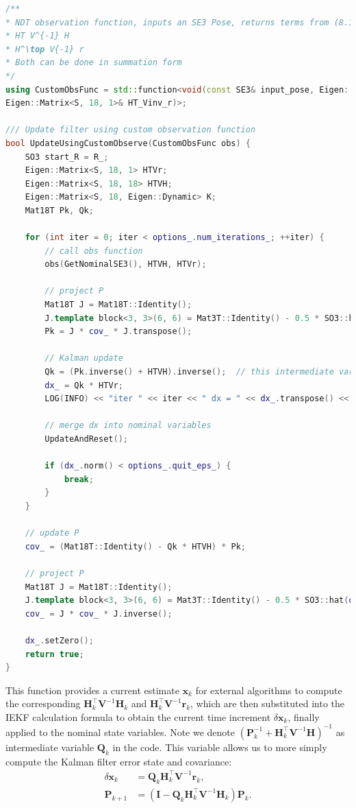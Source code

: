 \begin{lstlisting}[language=c++,caption=src/ch8/lio-iekf/iekf.hpp]
/**
* NDT observation function, inputs an SE3 Pose, returns terms from (8.10)
* HT V^{-1} H
* H^\top V{-1} r
* Both can be done in summation form
*/
using CustomObsFunc = std::function<void(const SE3& input_pose, Eigen::Matrix<S, 18, 18>& HT_Vinv_H,
Eigen::Matrix<S, 18, 1>& HT_Vinv_r)>;

/// Update filter using custom observation function
bool UpdateUsingCustomObserve(CustomObsFunc obs) {
	SO3 start_R = R_;
	Eigen::Matrix<S, 18, 1> HTVr;
	Eigen::Matrix<S, 18, 18> HTVH;
	Eigen::Matrix<S, 18, Eigen::Dynamic> K;
	Mat18T Pk, Qk;
	
	for (int iter = 0; iter < options_.num_iterations_; ++iter) {
		// call obs function
		obs(GetNominalSE3(), HTVH, HTVr);
		
		// project P
		Mat18T J = Mat18T::Identity();
		J.template block<3, 3>(6, 6) = Mat3T::Identity() - 0.5 * SO3::hat((R_.inverse() * start_R).log());
		Pk = J * cov_ * J.transpose();
		
		// Kalman update
		Qk = (Pk.inverse() + HTVH).inverse();  // this intermediate variable can be used in final update
		dx_ = Qk * HTVr;
		LOG(INFO) << "iter " << iter << " dx = " << dx_.transpose() << ", dxn: " << dx_.norm();
		
		// merge dx into nominal variables
		UpdateAndReset();
		
		if (dx_.norm() < options_.quit_eps_) {
			break;
		}
	}
	
	// update P
	cov_ = (Mat18T::Identity() - Qk * HTVH) * Pk;
	
	// project P
	Mat18T J = Mat18T::Identity();
	J.template block<3, 3>(6, 6) = Mat3T::Identity() - 0.5 * SO3::hat(dx_.template block<3, 1>(6, 0));
	cov_ = J * cov_ * J.inverse();
	
	dx_.setZero();
	return true;
}
\end{lstlisting}

This function provides a current estimate $\mathbf{x}_k$ for external algorithms to compute the corresponding $\mathbf{H}_k^\top \mathbf{V}^{-1} \mathbf{H}_k$ and $\mathbf{H}_k^\top \mathbf{V}^{-1} \mathbf{r}_k$, which are then substituted into the IEKF calculation formula to obtain the current time increment $\delta \mathbf{x}_k$, finally applied to the nominal state variables. Note we denote $(\mathbf{P}_k^{-1} + \mathbf{H}_k^\top \mathbf{V}^{-1} \mathbf{H})^{-1}$ as intermediate variable $\mathbf{Q}_k$ in the code. This variable allows us to more simply compute the Kalman filter error state and covariance:
\begin{align}\label{key}
	\delta \mathbf{x}_k &= \mathbf{Q}_k \mathbf{H}_k^\top \mathbf{V}^{-1} \mathbf{r}_k, \\
	\mathbf{P}_{k+1} &= (\mathbf{I} - \mathbf{Q}_k \mathbf{H}^\top_k \mathbf{V}^{-1} \mathbf{H}_k) \mathbf{P}_k.
\end{align}

